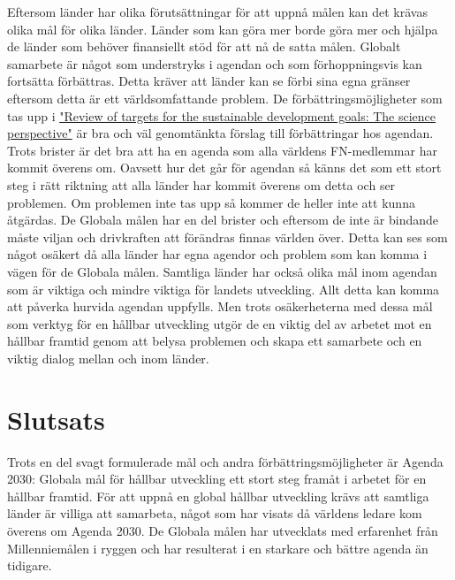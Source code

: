 \documentclass{report}
\begin{document}
Eftersom länder har olika förutsättningar för att uppnå målen kan det krävas olika mål för olika länder. Länder som kan göra mer borde göra mer och hjälpa de länder som behöver finansiellt stöd för att nå de satta målen. Globalt samarbete är något som understryks i agendan och som förhoppningsvis kan fortsätta förbättras. Detta kräver att länder kan se förbi sina egna gränser eftersom detta är ett världsomfattande problem.
De förbättringsmöjligheter som tas upp i \href{http://www.icsu.org/publications/reports-and-reviews/review-of-targets-for-the-sustainable-development-goals-the-science-perspective-2015/SDG-Report.pdf}{"Review of targets for the sustainable development goals: The science perspective"} är bra och väl genomtänkta förslag till förbättringar hos agendan. Trots brister är det bra att ha en agenda som alla världens FN-medlemmar har kommit överens om. Oavsett hur det går för agendan så känns det som ett stort steg i rätt riktning att alla länder har kommit överens om detta och ser problemen. Om problemen inte tas upp så kommer de heller inte att kunna åtgärdas. De Globala målen har en del brister och eftersom de inte är bindande måste viljan och drivkraften att förändras finnas världen över. Detta kan ses som något osäkert då alla länder har egna agendor och problem som kan komma i vägen för de Globala målen. Samtliga länder har också olika mål inom agendan som är viktiga och mindre viktiga för landets utveckling. Allt detta kan komma att påverka hurvida agendan uppfylls. Men trots osäkerheterna med dessa mål som verktyg för en hållbar utveckling utgör de en viktig del av arbetet mot en hållbar framtid genom att belysa problemen och skapa ett samarbete och en viktig dialog mellan och inom länder. \\



\newpage
\section{Slutsats}
Trots en del svagt formulerade mål och andra förbättringsmöjligheter är Agenda 2030: Globala mål för hållbar utveckling ett stort steg framåt i arbetet för en hållbar framtid. För att uppnå en global hållbar utveckling krävs att samtliga länder är villiga att samarbeta, något som har visats då världens ledare kom överens om Agenda 2030. De Globala målen har utvecklats med erfarenhet från Millenniemålen i ryggen och har resulterat i en starkare och bättre agenda än tidigare.


 
\end{document}
